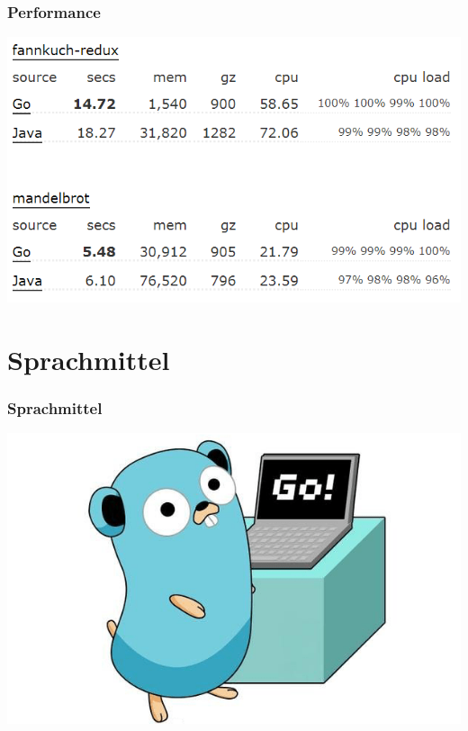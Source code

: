 \documentclass{beamer}
\begin{document}
\begin{frame}
\frametitle{Performance}

\centering
\includegraphics[scale=0.6]{performance2.png}

\end{frame}


\section{Sprachmittel}
\begin{frame}
\frametitle{Sprachmittel}

\centering
\includegraphics[scale=0.5]{sprachmittel.png}

\end{frame}

\end{document}
